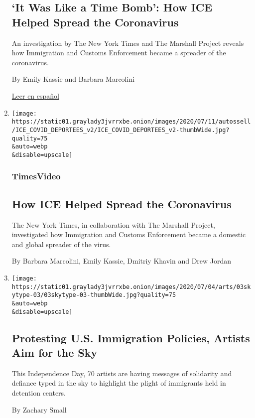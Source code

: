 \begin{enumerate}
  \hypertarget{it-was-like-a-time-bomb-how-ice-helped-spread-the-coronavirus}{%
  \subsection{`It Was Like a Time Bomb': How ICE Helped Spread the
  Coronavirus}\label{it-was-like-a-time-bomb-how-ice-helped-spread-the-coronavirus}}

  An investigation by The New York Times and The Marshall Project
  reveals how Immigration and Customs Enforcement became a spreader of
  the coronavirus.

  By Emily Kassie and Barbara Marcolini

  \href{https://www.nytimes3xbfgragh.onion/es/2020/07/13/espanol/mundo/coronavirus-deportaciones-ice.html}{Leer
  en español}
\item
  \href{/video/us/100000007122997/ice-deportations-coronavirus-video.html}{}

  \texttt{[image: https://static01.graylady3jvrrxbe.onion/images/2020/07/11/autossell/ICE\_COVID\_DEPORTEES\_v2/ICE\_COVID\_DEPORTEES\_v2-thumbWide.jpg?quality=75\\\&auto=webp\\\&disable=upscale]}

  \hypertarget{timesvideo}{%
  \subsubsection{TimesVideo}\label{timesvideo}}

  \hypertarget{how-ice-helped-spread-the-coronavirus}{%
  \subsection{How ICE Helped Spread the
  Coronavirus}\label{how-ice-helped-spread-the-coronavirus}}

  The New York Times, in collaboration with The Marshall Project,
  investigated how Immigration and Customs Enforcement became a domestic
  and global spreader of the virus.

  By Barbara Marcolini, Emily Kassie, Dmitriy Khavin and Drew Jordan
\item
  \href{/2020/07/03/arts/design/july-4-skytyping-skywriting-immigration.html}{}

  \texttt{[image: https://static01.graylady3jvrrxbe.onion/images/2020/07/04/arts/03skytype-03/03skytype-03-thumbWide.jpg?quality=75\\\&auto=webp\\\&disable=upscale]}

  \hypertarget{protesting-us-immigration-policies-artists-aim-for-the-sky}{%
  \subsection{Protesting U.S. Immigration Policies, Artists Aim for the
  Sky}\label{protesting-us-immigration-policies-artists-aim-for-the-sky}}

  This Independence Day, 70 artists are having messages of solidarity
  and defiance typed in the sky to highlight the plight of immigrants
  held in detention centers.

  By Zachary Small
\end{enumerate}

